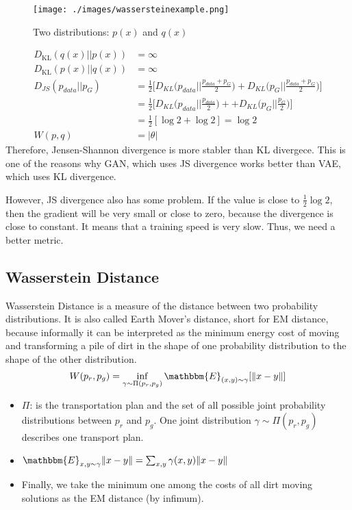 \begin{figure}[h]
	\begin{center}
		\texttt{[image: ./images/wassersteinexample.png]}
	\end{center}
	\caption{Two distributions: $p(x)$ and $q(x)$}
	\label{fig:wassersteinexample}
\end{figure}

\begin{align*}
	D_\textrm{KL}(q(x)||p(x)) &= \infty\\
	D_\textrm{KL}(p(x)||q(x)) &= \infty\\
	D_{JS}(p_{data}||p_{G}) &= \frac{1}{2}\Bigg[D_{KL}\Big(p_{data}\Big|\Big|\frac{p_{data}+p_{G}}{2}\Big)+D_{KL}\Big(p_{G}\Big|\Big|\frac{p_{data}+p_{G}}{2}\Big)\Bigg]\\
	& = \frac{1}{2}\Bigg[D_{KL}\Big(p_{data}\Big|\Big|\frac{p_{data}}{2}\Big)++D_{KL}\Big(p_{G}\Big|\Big|\frac{p_{G}}{2}\Big)\Bigg]\\
	& = \frac{1}{2}[\log 2 + \log 2] = \log 2\\
	W(p,q) & = |\theta|
\end{align*}
Therefore, Jensen-Shannon divergence is more stabler than KL divergece. This is one of the reasons why GAN, which uses JS divergence works better than VAE, which uses KL divergence. 

However, JS divergence also has some problem. If the value is close to $\frac{1}{2}\log 2$, then the gradient will be very small or close to zero, because the divergence is close to constant. It means that a training speed is very slow. Thus, we need a better metric. 

\subsection{Wasserstein Distance}
Wasserstein Distance is a measure of the distance between two probability distributions. It is also called Earth Mover’s distance, short for EM distance, because informally it can be interpreted as the minimum energy cost of moving and transforming a pile of dirt in the shape of one probability distribution to the shape of the other distribution.
\begin{equation*}
	W(p_r, p_g) = \inf_{\gamma \sim \Pi(p_r, p_g)} \mathbbm{E}_{(x, y) \sim \gamma}[\| x-y \|]
\end{equation*}

\begin{itemize}
	\item $\Pi$: is the transportation plan and the set of all possible joint probability distributions between $p_r$ and $p_g$. One joint distribution $\gamma \sim \Pi(p_r, p_g)$ describes one transport plan.\
	\item $\mathbbm{E}_{x, y \sim \gamma} \| x-y \| = \sum_{x, y} \gamma(x, y) \| x-y \|$
	\item Finally, we take the minimum one among the costs of all dirt moving solutions as the EM distance (by infimum). 
\end{itemize}


